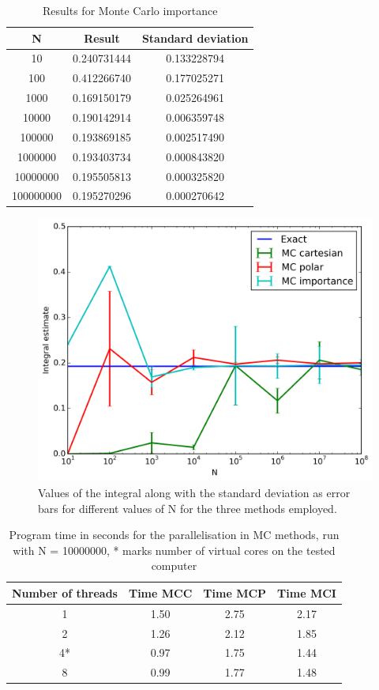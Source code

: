 \documentclass[11pt,a4paper,english,final]{article}
\numberwithin{equation}{section}
\newcommand{\figurewidth}{.85\textwidth}
\begin{document}
\begin{table}
\centering
\caption{Results for Monte Carlo importance} \vspace{2mm}
\begin{tabular}{|c|c|c|} \hline
N & Result & Standard deviation\\ \hline
10 & 0.240731444 & 0.133228794\\
100 & 0.412266740 & 0.177025271\\
1000 & 0.169150179 & 0.025264961\\
10000 & 0.190142914 & 0.006359748\\
100000 & 0.193869185 & 0.002517490\\
1000000 & 0.193403734 & 0.000843820\\
10000000 & 0.195505813 & 0.000325820\\
100000000 & 0.195270296 & 0.000270642\\ \hline
\end{tabular}
\label{table:MCI}
\end{table}


\begin{figure}
\centering
\includegraphics[width=\figurewidth]{analyse/MC_error.png}
\caption{Values of the integral along with the standard deviation as 
error bars for 
different values of N for the three methods employed.}
\label{fig:MC}
\end{figure}

\begin{table}
\centering
\caption{Program time in seconds for the parallelisation in MC methods, 
run with N = 10000000, * marks number of virtual cores on the tested
computer}
\vspace{2mm}
\begin{tabular}{|c|c|c|c|} \hline 
Number of threads & Time MCC & Time MCP & Time MCI\\ \hline
1 & 1.50 & 2.75 & 2.17\\
2 & 1.26 & 2.12 & 1.85\\
4* & 0.97 & 1.75 & 1.44\\
8 & 0.99 & 1.77 & 1.48\\ \hline
\end{tabular}
\label{table:MCtime}
\end{table}
\end{document}
